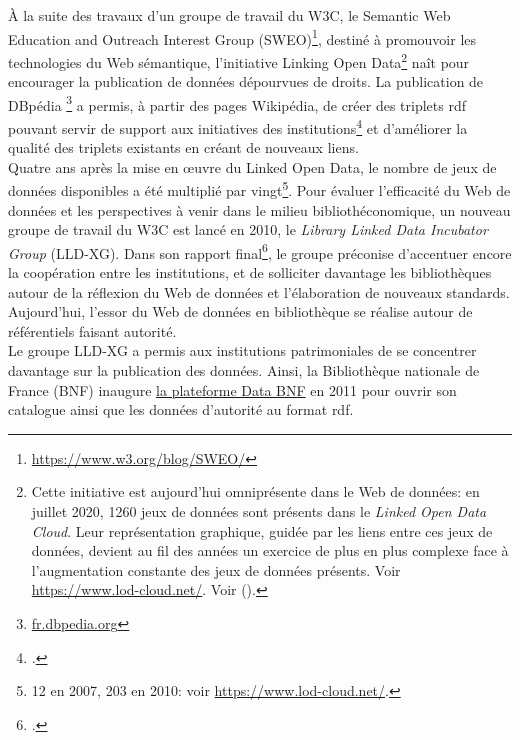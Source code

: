 À la suite des travaux d'un groupe de travail du W3C, le Semantic Web Education and Outreach Interest Group (SWEO)\footnote{\url{https://www.w3.org/blog/SWEO/}}, destiné à promouvoir les technologies du Web sémantique, l'initiative \og Linking Open Data\fg{}\footnote{Cette initiative est aujourd'hui omniprésente dans le Web de données: en juillet 2020, 1260 jeux de données sont présents dans le \textit{Linked Open Data Cloud}. Leur représentation graphique, guidée par les liens entre ces jeux de données, devient au fil des années un exercice de plus en plus complexe face à l'augmentation constante des jeux de données présents. Voir \url{https://www.lod-cloud.net/}. Voir  ().} naît pour encourager la publication de données dépourvues de droits. La publication de DBpédia \footnote{\url{fr.dbpedia.org}} a permis, à partir des pages Wikipédia, de créer des triplets \ac{rdf} pouvant servir de support aux initiatives des institutions\footcite{bermes_convergence_2013} et d'améliorer la qualité des triplets existants en créant de nouveaux liens.\\

Quatre ans après la mise en œuvre du Linked Open Data, le nombre de jeux de données disponibles a été multiplié par vingt\footnote{12 en 2007, 203 en 2010: voir \url{https://www.lod-cloud.net/}.}. Pour évaluer l'efficacité du Web de données et les perspectives à venir dans le milieu bibliothéconomique, un nouveau groupe de travail du W3C est lancé en 2010, le \textit{Library Linked Data Incubator Group} (LLD-XG). Dans son rapport final\footcite{baker_rapport_2012}, le groupe préconise d'accentuer encore la coopération entre les institutions, et de solliciter davantage les bibliothèques autour de la réflexion du Web de données et l'élaboration de nouveaux standards. Aujourd'hui, l'essor du Web de données en bibliothèque se réalise autour de référentiels faisant autorité.\\

Le groupe LLD-XG a permis aux institutions patrimoniales de se concentrer davantage sur la publication des données. Ainsi, la Bibliothèque nationale de France (BNF) inaugure \href{data.bnf.fr}{la plateforme Data BNF} en 2011 pour ouvrir son catalogue ainsi que les données d'autorité au format \ac{rdf}.

